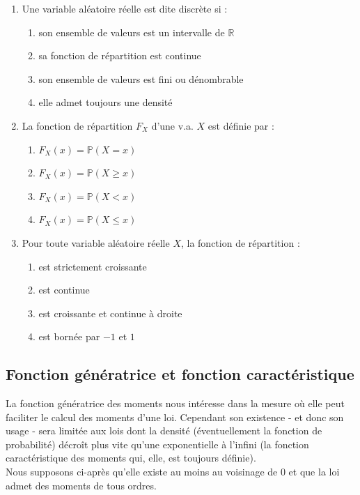 \documentclass[../PolyS4.tex]{subfiles}
\begin{document}
\begin{enumerate}
\item Une variable aléatoire réelle est dite discrète si :
\begin{enumerate}
\item son ensemble de valeurs est un intervalle de $\mathbb{R}$
\item sa fonction de répartition est continue
\item son ensemble de valeurs est fini ou dénombrable
\item elle admet toujours une densité
\end{enumerate}

\item La fonction de répartition $F_X$ d'une v.a. $X$ est définie par :
\begin{enumerate}
\item $F_X(x)=\mathbb P(X=x)$
\item $F_X(x)=\mathbb P(X\ge x)$
\item $F_X(x)=\mathbb P(X<x)$
\item $F_X(x)=\mathbb P(X\le x)$
\end{enumerate}

\item Pour toute variable aléatoire réelle $X$, la fonction de répartition :
\begin{enumerate}
\item est strictement croissante
\item est continue
\item est croissante et continue à droite
\item est bornée par $-1$ et $1$
\end{enumerate}
\end{enumerate}


\subsection{ Fonction génératrice et fonction caractéristique}


La fonction génératrice des moments nous intéresse dans la mesure où elle peut faciliter le calcul des moments d'une loi. Cependant son existence - et donc  son usage - sera limitée aux lois dont la densité (éventuellement la fonction de  probabilité) décroît plus vite qu'une exponentielle à l'infini (la fonction caractéristique des moments qui, elle, est toujours définie).\\
Nous supposons ci-après qu'elle existe au moins au voisinage de $0$ et que la loi admet des moments de tous ordres.\\
\end{document}
